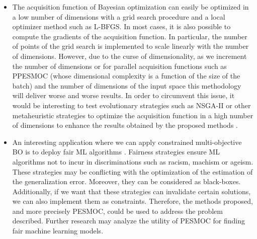 \begin{itemize}
    \item The acquisition function of Bayesian optimization can easily be optimized in a low number of dimensions with a grid search procedure and a local optimizer method such as L-BFGS. In most cases, it is also possible to compute the gradients of the acquisition function. In particular, the number of points of the grid search is implemented to scale linearly with the number of dimensions. However, due to the curse of dimensionality, as we increment the number of dimensions or for parallel acquisition functions such as PPESMOC (whose dimensional complexity is a function of the size of the batch) and the number of dimensions of the input space this methodology will deliver worse and worse results. In order to circumvent this issue, it would be interesting to test evolutionary strategies such as NSGA-II or other metaheuristic strategies to optimize the acquisition function in a high number of dimensions to enhance the results obtained by the proposed methods \citep{deb2002fast}.
    \item An interesting application where we can apply constrained multi-objective BO is to deploy fair ML algorithms \citep{perrone2020fair}. Fairness strategies ensure ML algorithms not to incur in discriminations such as racism, machism or ageism. These strategies may be conflicting with the optimization of the estimation of the generalization error. Moreover, they can be considered as black-boxes. Additionally, if we want that these strategies can invalidate certain solutions, we can also implement them as constraints. Therefore, the methods proposed, and more precisely PESMOC, could be used to address the problem described. Further research may analyze the utility of PESMOC for finding fair machine learning models.
\end{itemize}

